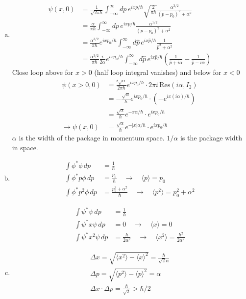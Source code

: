 \documentclass[../main.tex]{subfiles}
\begin{document}
\begin{enumerate}[(a)]
\item
\begin{align}
\psi(x,0)
&=\frac{1}{\sqrt{2\pi\hbar}}\int_{-\infty}^\infty dp\,e^{ixp/\hbar}\sqrt{\frac{2}{\pi\hbar}}\frac{\alpha^{3/2}}{(p-p_0)^2+\alpha^2}\\
&=\frac{\alpha}{\pi\hbar}\int_{-\infty}^\infty dp\,e^{ixp/\hbar}\frac{\alpha^{1/2}}{(p-p_0)^2+\alpha^2}\\
&=\frac{\alpha^{3/2}}{\pi\hbar}e^{ixp_0/\hbar}\int_{-\infty}^\infty d\hat{p}\,e^{ix\hat{p}/\hbar}\frac{1}{\hat{p}^2+\alpha^2}\\
&=\frac{\alpha^{3/2}}{\pi\hbar}\frac{i}{2\alpha}e^{ixp_0/\hbar}\int_{-\infty}^\infty d\hat{p}\,e^{ix\hat{p}/\hbar}\left(\frac{1}{\hat{p}+i\alpha}-\frac{1}{\hat{p}-i\alpha}\right)
\end{align}
Close loop above for $x>0$ (half loop integral vanishes) and below for $x<0$
\begin{align}
\psi(x>0,0)
&=\frac{i\sqrt{\alpha}}{2\pi\hbar}e^{ixp_0/\hbar}\cdot 2\pi i\,\text{Res}(i\alpha,I_2)\\
&=-\frac{\sqrt{\alpha}}{\hbar}e^{ixp_0/\hbar}\cdot\left(-e^{ix(i\alpha)/\hbar}\right)\\
&=\frac{\sqrt{\alpha}}{\hbar}e^{-x\alpha/\hbar}\cdot e^{ixp_0/\hbar}\\
\rightarrow\psi(x,0)
&=\frac{\sqrt{\alpha}}{\hbar}e^{-|x|\alpha/\hbar}\cdot e^{ixp_0/\hbar}
\end{align}
$\alpha$ is the width of the package in momentum space. $1/\alpha$ is the package width in space.
\item
\begin{align}
\int\phi^*\phi\,dp&=\frac{1}{\hbar}\\
\int\phi^* p \phi\,dp&=\frac{p_0}{\hbar}\quad\rightarrow\quad\langle p\rangle=p_0\\
\int\phi^* p^2 \phi\,dp&=\frac{p_0^2+\alpha^2}{\hbar}\quad\rightarrow\quad\langle p^2\rangle=p_0^2+\alpha^2
\end{align}

\begin{align}
\int\psi^*\psi\,dp&=\frac{1}{\hbar}\\
\int\psi^* x \psi\,dp&=0\quad\rightarrow\quad\langle x\rangle=0\\
\int\psi^* x^2 \psi\,dp&=\frac{\hbar}{2\alpha^2}\quad\rightarrow\quad\langle x^2\rangle=\frac{\hbar^2}{2\alpha^2}
\end{align}
\item
\begin{align}
\Delta x=\sqrt{\langle x^2 \rangle-\langle x \rangle^2}=\frac{\hbar}{\sqrt{2}\alpha}\\
\Delta p=\sqrt{\langle p^2 \rangle-\langle p \rangle^2}=\alpha\\
\Delta x\cdot\Delta p=\frac{\hbar}{\sqrt{2}}>\hbar/2
\end{align}
\end{enumerate}
\end{document}

